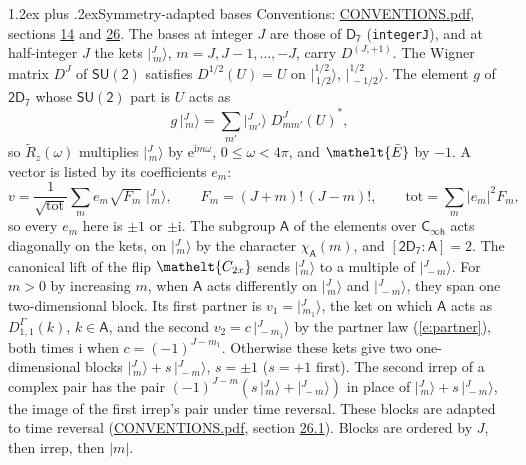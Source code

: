 \documentclass[10pt,a4paper]{article}
\makeatletter
\renewcommand\section{\@startsection{section}{1}{\z@}{-3ex plus -1ex minus -.2ex}%
  {1.2ex plus .2ex}{\normalfont\large\sffamily\bfseries\color{parttitle}}}
\numberwithin{equation}{section}
\newcommand{\eltfont}[1]{{\let\sigma\eltsigma\mathelt{#1}}}
\newcommand{\grp}[1]{\mathsf{#1}}
\newcommand{\elt}[1]{\eltfont{#1}}
\newcommand{\grpindex}[2]{[#1 : #2]}
\newcommand{\iunit}{\mathrm{i}}
\newcommand{\expe}{\mathrm{e}}
\newcommand{\irrJp}[2]{D^{(#1,#2)}}
\newcommand{\repD}[1]{D^{#1}}
\newcommand{\wignerD}[1]{D^{#1}}
\newcommand{\chiA}{\chi_{\grp{A}}}
\newcommand{\conj}[1]{{#1}^{*}}
\newcommand{\jm}[2]{\bigl\lvert{}^{#1}_{\,#2}\bigr\rangle}
\newcommand{\barred}[1]{\bar{#1}}
\newcommand{\lift}[1]{\tilde{#1}}
\makeatother
\begin{document}
\section{Symmetry-adapted bases}\label{s:bases}
Conventions: \href{../../CONVENTIONS.pdf}{CONVENTIONS.pdf}, sections \href{../../../rotation/CONVENTIONS.pdf\#conv.14}{14} and \href{../../CONVENTIONS.pdf\#conv.26}{26}.
\leavevmode\label{n:index.m}\label{n:vector.ket}The bases at integer $J$ are those of \href{../../../rotation/data/pdf/D7.pdf}{$\grp{D_{7}}$} (\texttt{integerJ}), and at half-integer $J$ the kets $\jm{J}{m}$, $m = J, J-1, \dots, -J$, carry $\irrJp{J}{+1}$. \label{n:matrix.wigner}The Wigner matrix $\wignerD{J}$ of $\grp{SU(2)}$ satisfies $\wignerD{1/2}(U) = U$ on $\jm{1/2}{1/2}$, $\jm{1/2}{-1/2}$. The element $g$ of $\grp{2D_{7}}$ whose $\grp{SU(2)}$ part is $U$ acts as
\begin{equation}\label{e:action}g\,\jm{J}{m} = \sum_{m'} \jm{J}{m'}\; \conj{\wignerD{J}_{m m'}(U)},\end{equation}
so $\lift{R}_{z}(\omega)$ multiplies $\jm{J}{m}$ by $\expe^{\iunit m\omega}$, $0 \le \omega < 4\pi$, and $\elt{\barred{E}}$ by $-1$. \label{n:index.ketcoefficient}\label{n:vector.basis.symmetry}\label{n:index.ketweight}\label{n:index.total}A vector is listed by its coefficients $e_m$:
\begin{equation}\label{e:ket}v = \frac{1}{\sqrt{\mathrm{tot}}}\sum_m e_m\sqrt{F_m}\;\jm{J}{m},\qquad F_m = (J+m)!\,(J-m)!,\qquad \mathrm{tot} = \sum_m |e_m|^2F_m,\end{equation}
so every $e_m$ here is $\pm 1$ or $\pm\iunit$.
\leavevmode\label{n:group.A}\label{n:function.character.abelian}The subgroup $\grp{A}$ of the elements over $\grp{C_{\infty h}}$ acts diagonally on the kets, on $\jm{J}{m}$ by the character $\chiA(m)$, and $\grpindex{\grp{2D_{7}}}{\grp{A}} = 2$. The canonical lift of the flip $\elt{C_{2x}}$ sends $\jm{J}{m}$ to a multiple of $\jm{J}{-m}$. For $m > 0$ by increasing $m$, when $\grp{A}$ acts differently on $\jm{J}{m}$ and $\jm{J}{-m}$, they span one two-dimensional block. \label{n:index.partner.sign}Its first partner is $v_1 = \jm{J}{m_1}$, the ket on which $\grp{A}$ acts as $\repD{\Gamma}_{1,1}(k)$, $k \in \grp{A}$, and the second $v_2 = c\,\jm{J}{-m_1}$ by the partner law (\ref{e:partner}), both times $\iunit$ when $c = (-1)^{J-m_1}$. \label{n:index.pair.sign}Otherwise these kets give two one-dimensional blocks $\jm{J}{m} + s\,\jm{J}{-m}$, $s = \pm 1$ ($s = +1$ first). The second irrep of a complex pair has the pair $(-1)^{J-m}(s\,\jm{J}{m} + \jm{J}{-m})$ in place of $\jm{J}{m} + s\,\jm{J}{-m}$, the image of the first irrep's pair under time reversal. These blocks are adapted to time reversal (\href{../../CONVENTIONS.pdf}{CONVENTIONS.pdf}, section \href{../../CONVENTIONS.pdf\#conv.26.1}{26.1}). Blocks are ordered by $J$, then irrep, then $|m|$.
\end{document}
